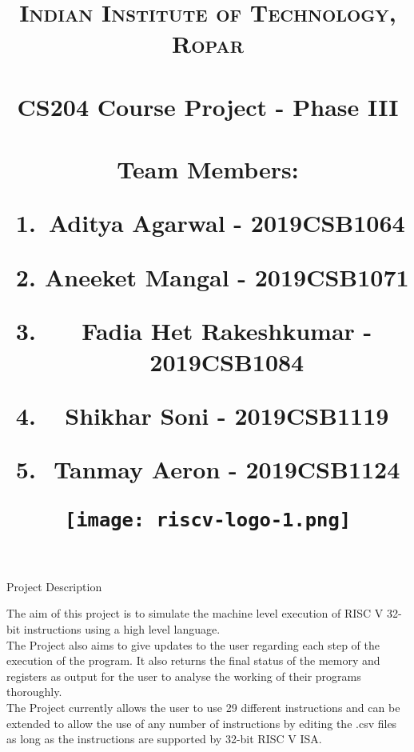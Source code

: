 \documentclass{article}
\title{
\normalfont \large 
\textsc{Indian Institute of Technology, Ropar} \\    [40pt] 
\horrule{} \\[0.4cm] 
\Huge CS204 Course Project - Phase III\\ 
\horrule{} \\[0.5cm]
\protect\vspace{2.0cm}
\large
\textup{Team Members:}\\\vspace{1cm}
\begin{centering}
\begin{enumerate}
    \item Aditya Agarwal - 2019CSB1064
    \item Aneeket Mangal - 2019CSB1071
    \item Fadia Het Rakeshkumar - 2019CSB1084
    \item Shikhar Soni - 2019CSB1119
    \item Tanmay Aeron - 2019CSB1124
\end{enumerate}
\end{centering}
\date{}
\centering
\protect\vspace{4.0cm}
\texttt{[image: riscv-logo-1.png]}
}
\begin{document}
\maketitle
\newpage
\begin{centering}
\begin{Huge}
\textsf{Project Description}\\
\end{Huge}
\end{centering}
\protect\vspace{2.0cm}
\LARGE
The aim of this project is to simulate the machine level execution of RISC V 32-bit instructions using a high level language.\\

The Project also aims to give updates to the user regarding each step of the execution of the program. It also returns the final status of the memory and registers as output for the user to analyse the working of their programs thoroughly.\\

The Project currently allows the user to use 29 different instructions and can be extended to allow the use of any number of instructions by editing the .csv files as long as the instructions are supported by 32-bit RISC V ISA. \\
\end{document}
